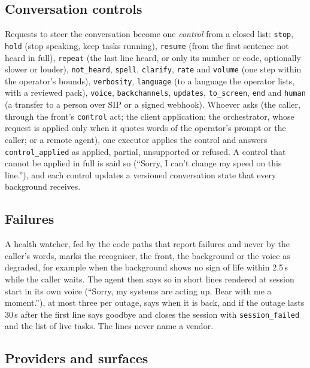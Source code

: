 \subsection{Conversation controls}\label{sec:sys-controls}

Requests to steer the conversation become one \emph{control} from a closed list: \texttt{stop}, \texttt{hold} (stop
speaking, keep tasks running), \texttt{resume} (from the first sentence not heard in full), \texttt{repeat} (the last line
heard, or only its number or code, optionally slower or louder), \texttt{not\_heard}, \texttt{spell}, \texttt{clarify},
\texttt{rate} and \texttt{volume} (one step within the operator's bounds), \texttt{verbosity}, \texttt{language} (to a language
the operator lists, with a reviewed pack), \texttt{voice}, \texttt{backchannels}, \texttt{updates}, \texttt{to\_screen},
\texttt{end} and \texttt{human} (a transfer to a person over SIP or a signed webhook). Whoever asks (the caller, through the
front's \texttt{control} act; the client application; the orchestrator, whose request is applied only when it quotes words of
the operator's prompt or the caller; or a remote agent), one executor applies the control and answers
\texttt{control\_applied} as applied, partial, unsupported or refused. A control that cannot be applied in full is said so
(``Sorry, I can't change my speed on this line.''), and each control updates a versioned conversation state that every
background receives.

\subsection{Failures}\label{sec:sys-failure}

A health watcher, fed by the code paths that report failures and never by the caller's words, marks the recogniser, the front,
the background or the voice as degraded, for example when the background shows no sign of life within 2.5\,s while the caller
waits. The agent then says so in short lines rendered at session start in its own voice (``Sorry, my systems are acting up. Bear
with me a moment.''), at most three per outage, says when it is back, and if the outage lasts 30\,s after the first line says
goodbye and closes the session with \texttt{session\_failed} and the list of live tasks. The lines never name a vendor.

\subsection{Providers and surfaces}\label{sec:sys-surfaces}

